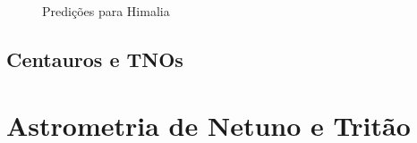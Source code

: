 \documentclass[12pt,a4paper]{monografia}
\begin{document}
\begin{figure}
\begin{centering}
\caption{Predições para Himalia}
\label{Fig: occ-Himalia}
\end{centering}
\end{figure}


\section{Centauros e TNOs}
\label{Sec: TNOs}

\chapter{Astrometria de Netuno e Tritão}
\label{Cap: Netuno}



\glsaddall
\printglossary




\end{document}
